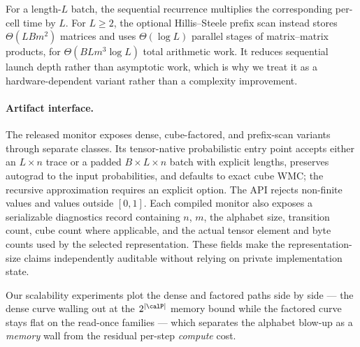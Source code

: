 For a length-$L$ batch, the sequential recurrence multiplies the corresponding per-cell time by $L$. For $L\geq 2$, the optional Hillis--Steele prefix scan instead stores $\Theta(LBm^2)$ matrices and uses $\Theta(\log L)$ parallel stages of matrix--matrix products, for $\Theta(BLm^3\log L)$ total arithmetic work. It reduces sequential launch depth rather than asymptotic work, which is why we treat it as a hardware-dependent variant rather than a complexity improvement.

\paragraph{Artifact interface.}
The released monitor exposes dense, cube-factored, and prefix-scan variants through separate classes. Its tensor-native probabilistic entry point accepts either an $L\times n$ trace or a padded $B\times L\times n$ batch with explicit lengths, preserves autograd to the input probabilities, and defaults to exact cube WMC; the recursive approximation requires an explicit option. The API rejects non-finite values and values outside $[0,1]$. Each compiled monitor also exposes a serializable diagnostics record containing $n$, $m$, the alphabet size, transition count, cube count where applicable, and the actual tensor element and byte counts used by the selected representation. These fields make the representation-size claims independently auditable without relying on private implementation state.

Our scalability experiments plot the dense and factored paths side by side --- the dense curve walling out at the $2^{|\calP|}$ memory bound while the factored curve stays flat on the read-once families --- which separates the alphabet blow-up as a \emph{memory} wall from the residual per-step \emph{compute} cost.
